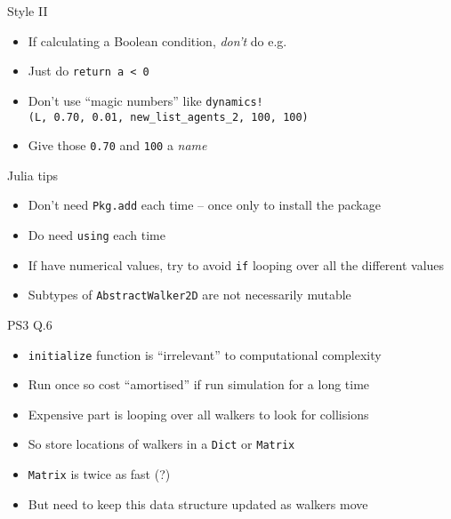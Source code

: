 \begin{frame}[fragile]{Style II}
\protect\hypertarget{style-ii}{}

\begin{itemize}
\item
  If calculating a Boolean condition, \emph{don't} do e.g.

\begin{Shaded}
\begin{Highlighting}[]
\end{Highlighting}
\end{Shaded}
\item
  Just do \texttt{return\ a\ \textless{}\ 0}
\item
  Don't use ``magic numbers'' like
  \texttt{dynamics!(L,\ 0.70,\ 0.01,\ new\_list\_agents\_2,\ 100,\ 100)}
\item
  Give those \texttt{0.70} and \texttt{100} a \emph{name}
\end{itemize}

\end{frame}

\begin{frame}[fragile]{Julia tips}
\protect\hypertarget{julia-tips}{}

\begin{itemize}
\item
  Don't need \texttt{Pkg.add} each time -- once only to install the
  package
\item
  Do need \texttt{using} each time
\item
  If have numerical values, try to avoid \texttt{if} looping over all
  the different values
\item
  Subtypes of \texttt{AbstractWalker2D} are not necessarily mutable
\end{itemize}

\end{frame}

\begin{frame}[fragile]{PS3 Q.6}
\protect\hypertarget{ps3-q.6}{}

\begin{itemize}
\item
  \texttt{initialize} function is ``irrelevant'' to computational
  complexity
\item
  Run once so cost ``amortised'' if run simulation for a long time
\item
  Expensive part is looping over all walkers to look for collisions
\item
  So store locations of walkers in a \texttt{Dict} or \texttt{Matrix}
\item
  \texttt{Matrix} is twice as fast (?)
\item
  But need to keep this data structure updated as walkers move
\end{itemize}

\end{frame}

